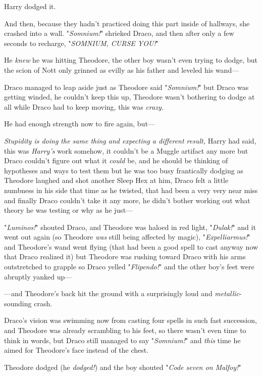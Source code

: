 Harry dodged it.

And then, because they hadn't practiced doing this part inside of hallways, she
crashed into a wall.
\later
"\emph{Somnium!}" shrieked Draco, and then after only a few seconds to
recharge, "\emph{SOMNIUM, CURSE YOU!}"

He \emph{knew} he was hitting Theodore, the other boy wasn't even trying to
dodge, but the scion of Nott only grinned as evilly as his father and leveled
his wand---

Draco managed to leap aside just as Theodore said "\emph{Somnium!}" but Draco
was getting winded, he couldn't keep this up, Theodore wasn't bothering to
dodge at all while Draco had to keep moving, this was \emph{crazy.}

He had enough strength now to fire again, but---

\emph{Stupidity is doing the same thing and expecting a different result,}
Harry had said, this was \emph{Harry's} work somehow, it couldn't be a Muggle
artifact any more but Draco couldn't figure out what it \emph{could} be, and he
should be thinking of hypotheses and ways to test them but he was too busy
frantically dodging as Theodore laughed and shot another Sleep Hex at him,
Draco felt a little numbness in his side that time as he twisted, that had been
a very very near miss and finally Draco couldn't take it any more, he didn't
bother working out what theory he was testing or why as he just---

"\emph{Luminos!}" shouted Draco, and Theodore was haloed in red light,
"\emph{Dulak!}" and it went out again (so Theodore \emph{was} still being
affected by magic), "\emph{Expelliarmus!}" and Theodore's wand went flying
(that had been a good spell to cast anyway now that Draco realized it) but
Theodore was rushing toward Draco with his arms outstretched to grapple so
Draco yelled "\emph{Flipendo!}" and the other boy's feet were abruptly yanked
up---

---and Theodore's back hit the ground with a surprisingly loud and
\emph{metallic}-sounding crash.

Draco's vision was swimming now from casting four spells in such fast
succession, and Theodore was already scrambling to his feet, so there wasn't
even time to think in words, but Draco still managed to say "\emph{Somnium!}"
and \emph{this} time he aimed for Theodore's face instead of the chest.

Theodore dodged (he \emph{dodged!}) and the boy shouted "\emph{Code seven on
Malfoy!}"

